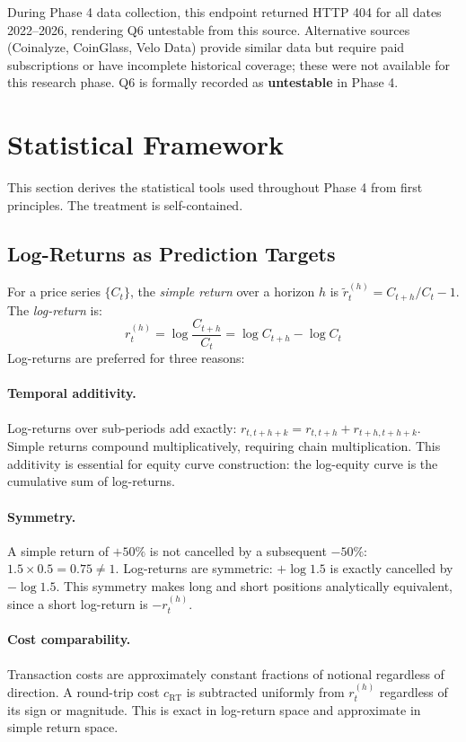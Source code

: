\documentclass[12pt, a4paper]{article}
\theoremstyle{plain}
\theoremstyle{definition}
\begin{document}
During Phase 4 data collection, this endpoint returned HTTP 404
for all dates 2022--2026, rendering Q6 untestable from this source.
Alternative sources (Coinalyze, CoinGlass, Velo Data) provide similar
data but require paid subscriptions or have incomplete historical
coverage; these were not available for this research phase.  Q6 is
formally recorded as \textbf{untestable} in Phase 4.

\section{Statistical Framework}
\label{sec:stats}

This section derives the statistical tools used throughout Phase 4 from
first principles.  The treatment is self-contained.

\subsection{Log-Returns as Prediction Targets}

For a price series $\{C_t\}$, the \emph{simple return} over a horizon $h$ is
$\tilde{r}_t^{(h)} = C_{t+h}/C_t - 1$.  The \emph{log-return} is:
\[
  r_t^{(h)} = \log\frac{C_{t+h}}{C_t} = \log C_{t+h} - \log C_t
\]
Log-returns are preferred for three reasons:

\paragraph{Temporal additivity.}
Log-returns over sub-periods add exactly: $r_{t,t+h+k} = r_{t,t+h} + r_{t+h,t+h+k}$.
Simple returns compound multiplicatively, requiring chain multiplication.
This additivity is essential for equity curve construction: the log-equity
curve is the cumulative sum of log-returns.

\paragraph{Symmetry.}
A simple return of $+50\%$ is not cancelled by a subsequent $-50\%$:
$1.5 \times 0.5 = 0.75 \neq 1$.  Log-returns are symmetric: $+\log 1.5$
is exactly cancelled by $-\log 1.5$.  This symmetry makes long and short
positions analytically equivalent, since a short log-return is $-r_t^{(h)}$.

\paragraph{Cost comparability.}
Transaction costs are approximately constant fractions of notional regardless
of direction.  A round-trip cost $c_{\text{RT}}$ is subtracted uniformly from
$r_t^{(h)}$ regardless of its sign or magnitude.  This is exact in log-return
space and approximate in simple return space.
\end{document}
